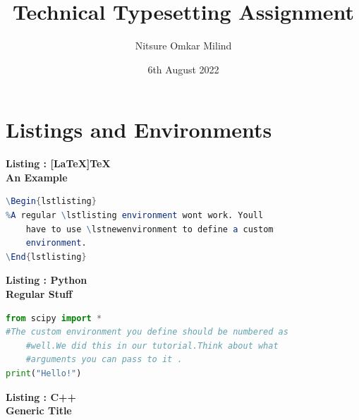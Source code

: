 \documentclass{article}
\title{Technical Typesetting Assignment}
\author{Nitsure Omkar Milind}
\date{6th August 2022}
\begin{document}
\maketitle

\tableofcontents

\newpage

\section{Listings and Environments}




    \begin{center}
      \textbf{\large{Listing \theListing : [LaTeX]TeX}}  \\
      \textbf{An Example}
    \end{center}
\vspace{-1em}

\begin{lstlisting}[language=Mathematica]
\Begin{lstlisting}
%A regular \lstlisting environment wont work. Youll
    have to use \lstnewenvironment to define a custom
    environment.
\End{lstlisting}
\end{lstlisting}

\vspace{2em}


    \begin{center}
      \textbf{\large{Listing \theListing : Python}}  \\
      \textbf{Regular Stuff}
    \end{center}
\vspace{-1em}

\begin{lstlisting}[language=Python]
from scipy import *
#The custom environment you define should be numbered as
    #well.We did this in our tutorial.Think about what
    #arguments you can pass to it .
print("Hello!")
\end{lstlisting}

\vspace{2em}


    \begin{center}
      \textbf{\large{Listing \theListing : C++}}  \\
      \textbf{Generic Title}
    \end{center}
\vspace{-1em}
\end{document}
